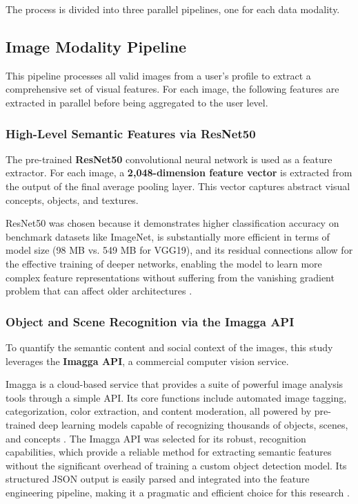 The process is divided into three parallel pipelines, one for each data modality.

\subsection{Image Modality Pipeline}
This pipeline processes all valid images from a user's profile to extract a comprehensive set of visual features. For each image, the following features are extracted in parallel before being aggregated to the user level.

\subsubsection{High-Level Semantic Features via ResNet50}
The pre-trained \textbf{ResNet50} convolutional neural network is used as a feature extractor. For each image, a \textbf{2,048-dimension feature vector} is extracted from the output of the final average pooling layer. This vector captures abstract visual concepts, objects, and textures.

ResNet50 was chosen because it demonstrates higher classification accuracy on benchmark datasets like ImageNet, is substantially more efficient in terms of model size (98 MB vs. 549 MB for VGG19), and its residual connections allow for the effective training of deeper networks, enabling the model to learn more complex feature representations without suffering from the vanishing gradient problem that can affect older architectures \citep{he2015, simonyan2014very}.

\subsubsection{Object and Scene Recognition via the Imagga API}
To quantify the semantic content and social context of the images, this study leverages the \textbf{Imagga API}, a commercial computer vision service.

Imagga is a cloud-based service that provides a suite of powerful image analysis tools through a simple API. Its core functions include automated image tagging, categorization, color extraction, and content moderation, all powered by pre-trained deep learning models capable of recognizing thousands of objects, scenes, and concepts \citep{imagga_website, imagga_solutions}. The Imagga API was selected for its robust, recognition capabilities, which provide a reliable method for extracting semantic features without the significant overhead of training a custom object detection model. Its structured JSON output is easily parsed and integrated into the feature engineering pipeline, making it a pragmatic and efficient choice for this research \citep{imagga_docs}.

